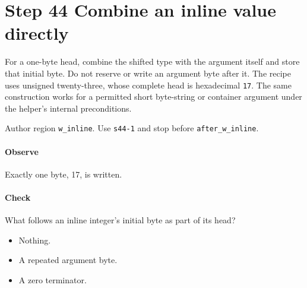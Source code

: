 \section{Step 44 Combine an inline value directly}\label{cbor-s44}
For a one-byte head, combine the shifted type with the argument itself and store that initial byte. Do not reserve or write an argument byte after it. The recipe uses unsigned twenty-three, whose complete head is hexadecimal \texttt{17}. The same construction works for a permitted short byte-string or container argument under the helper's internal preconditions.

Author region \texttt{w\_inline}. Use \texttt{s44-1} and stop before \texttt{after\_w\_inline}.

\paragraph{Observe} Exactly one byte, 17, is written.

\paragraph{Check} What follows an inline integer's initial byte as part of its head?
\begin{itemize}
\item[A.] Nothing.
\item[B.] A repeated argument byte.
\item[C.] A zero terminator.
\end{itemize}
